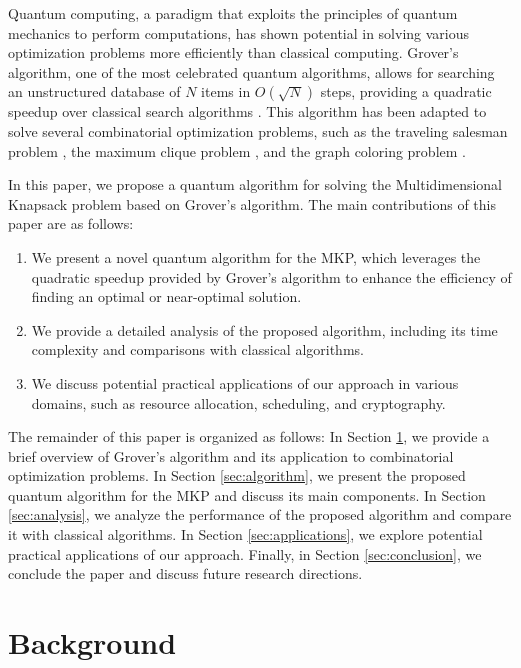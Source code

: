 Quantum computing, a paradigm that exploits the principles of quantum mechanics to perform computations, has shown potential in solving various optimization problems more efficiently than classical computing. Grover's algorithm, one of the most celebrated quantum algorithms, allows for searching an unstructured database of $N$ items in $O(\sqrt{N})$ steps, providing a quadratic speedup over classical search algorithms \cite{grover1996}. This algorithm has been adapted to solve several combinatorial optimization problems, such as the traveling salesman problem \cite{zalka1999}, the maximum clique problem \cite{childs2017}, and the graph coloring problem \cite{daskin2020}.

In this paper, we propose a quantum algorithm for solving the Multidimensional Knapsack problem based on Grover's algorithm. The main contributions of this paper are as follows:

\begin{enumerate}
    \item We present a novel quantum algorithm for the MKP, which leverages the quadratic speedup provided by Grover's algorithm to enhance the efficiency of finding an optimal or near-optimal solution.
    \item We provide a detailed analysis of the proposed algorithm, including its time complexity and comparisons with classical algorithms.
    \item We discuss potential practical applications of our approach in various domains, such as resource allocation, scheduling, and cryptography.
\end{enumerate}

The remainder of this paper is organized as follows: In Section \ref{sec:background}, we provide a brief overview of Grover's algorithm and its application to combinatorial optimization problems. In Section \ref{sec:algorithm}, we present the proposed quantum algorithm for the MKP and discuss its main components. In Section \ref{sec:analysis}, we analyze the performance of the proposed algorithm and compare it with classical algorithms. In Section \ref{sec:applications}, we explore potential practical applications of our approach. Finally, in Section \ref{sec:conclusion}, we conclude the paper and discuss future research directions.

\section{Background}
\label{sec:background}

